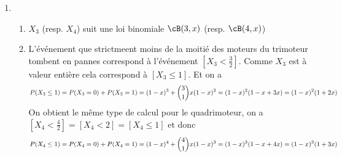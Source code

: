 \begin{correction}
\begin{enumerate}
\item \begin{enumerate}
\item $X_3$ (resp. $X_4$) suit une loi binomiale $\cB(3,x)$ (resp. $\cB(4,x)$)
\item L'événement que strictmeent moins de la moitié des moteurs du trimoteur tombent en pannes correspond à l'événement $[X_3 <\frac{3}{2}]$. Comme $X_3$ est à valeur entière cela correspond à $[X_3\leq 1]$. Et on a 
$$P(X_3\leq 1 ) =P(X_3=0)+P(X_3=1) =\\ (1-x)^3 +\binom{3}{1} x (1-x)^2 = (1-x)^2 (1-x + 3x) = (1-x)^2(1+2x)$$
On obtient le même type de calcul pour le quadrimoteur, on a $[X_4 <\frac{4}{2}]= [X_4<2]=[X_4\leq 1]$ et donc 
$$P(X_4 \leq 1 ) =P(X_4=0)+P(X_4=1) =\\ (1-x)^4 +\binom{4}{1} x (1-x)^3 = (1-x)^3 (1-x + 4x) = (1-x)^3(1+3x)$$



\end{enumerate}
\end{enumerate}
\end{correction}
